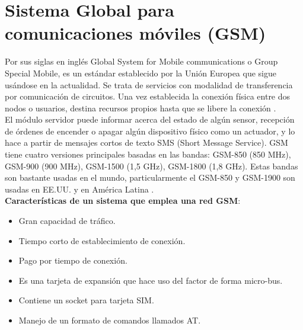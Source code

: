 %

\section{Sistema Global para comunicaciones móviles (GSM)} 
Por sus siglas en inglés Global System for Mobile communications o Group Special 
Mobile, es un estándar establecido por la Unión Europea que sigue usándose en la 
actualidad. Se trata de servicios con modalidad de transferencia por 
comunicación de circuitos. Una vez establecida la conexión física entre dos 
nodos o usuarios, destina recursos propios hasta que se libere la conexión
 \cite{gsm:transmision:servicios:web}. \\
El módulo servidor puede informar acerca del estado de algún sensor, recepción 
de órdenes de encender o apagar algún dispositivo físico como un actuador, y lo 
hace a partir de mensajes cortos de texto SMS (Short Message Service). 
GSM tiene cuatro versiones principales basadas en las bandas: GSM-850 (850 
MHz), GSM-900 (900 MHz), GSM-1500 (1,5 GHz), GSM-1800 (1,8 GHz). Estas bandas 
son bastante usadas en el mundo, particularmente el GSM-850 y GSM-1900 son 
usadas en EE.UU. y en América Latina \cite{gsm:capitulo:uap}. \\

\textbf{Características de un sistema que emplea una red GSM}:
\begin{itemize}
	\item Gran capacidad de tráfico.
	\item Tiempo corto de establecimiento de conexión.
	\item Pago por tiempo de conexión.
	\item Es una tarjeta de expansión que hace uso del factor de forma 
		micro-bus.
	\item Contiene un socket para tarjeta SIM.
	\item Manejo de un formato de comandos llamados AT.
\end{itemize}

